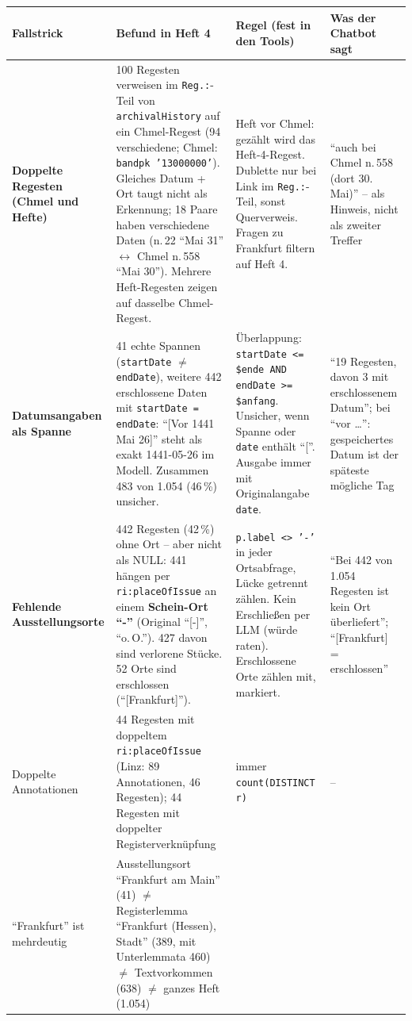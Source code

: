 \documentclass[10pt,a4paper]{article}
\newcommand{\code}[1]{\texttt{\small #1}}
\begin{document}
\begin{small}
\begin{longtable}{@{}p{2.3cm}p{5.7cm}p{4.3cm}p{3.3cm}@{}}
\toprule
\textbf{Fallstrick} & \textbf{Befund in Heft 4} & \textbf{Regel (fest in den Tools)} & \textbf{Was der Chatbot sagt}\\\midrule\endhead
\textbf{Doppelte Regesten (Chmel und Hefte)} &
100 Regesten verweisen im \code{Reg.:}-Teil von \code{archivalHistory} auf ein Chmel-Regest (94 verschiedene; Chmel: \code{bandpk '13000000'}). Gleiches Datum + Ort taugt nicht als Erkennung; 18 Paare haben verschiedene Daten (n.\,22 \enquote{Mai 31} $\leftrightarrow$ Chmel n.\,558 \enquote{Mai 30}). Mehrere Heft-Regesten zeigen auf dasselbe Chmel-Regest. &
Heft vor Chmel: gezählt wird das Heft-4-Regest. Dublette nur bei Link im \code{Reg.:}-Teil, sonst Querverweis. Fragen zu Frankfurt filtern auf Heft 4. &
\enquote{auch bei Chmel n.\,558 (dort 30.\,Mai)} -- als Hinweis, nicht als zweiter Treffer\\\midrule
\textbf{Datums\-angaben als Spanne} &
41 echte Spannen (\code{startDate} $\neq$ \code{endDate}), weitere 442 erschlossene Daten mit \code{startDate = endDate}: \enquote{[Vor 1441 Mai 26]} steht als exakt 1441-05-26 im Modell. Zusammen 483 von 1.054 (46\,\%) unsicher. &
Überlappung: \code{startDate <= \$ende AND endDate >= \$anfang}. Unsicher, wenn Spanne oder \code{date} enthält \enquote{[}. Ausgabe immer mit Originalangabe \code{date}. &
\enquote{19 Regesten, davon 3 mit erschlossenem Datum}; bei \enquote{vor \dots}: gespeichertes Datum ist der späteste mögliche Tag\\\midrule
\textbf{Fehlende Ausstellungsorte} &
442 Regesten (42\,\%) ohne Ort -- aber nicht als NULL: 441 hängen per \code{ri:placeOfIssue} an einem \textbf{Schein-Ort \enquote{-}} (Original \enquote{[-]}, \enquote{o.\,O.}). 427 davon sind verlorene Stücke. 52 Orte sind erschlossen (\enquote{[Frankfurt]}). &
\code{p.label <> '-'} in jeder Ortsabfrage, Lücke getrennt zählen. Kein Erschließen per LLM (würde raten). Erschlossene Orte zählen mit, markiert. &
\enquote{Bei 442 von 1.054 Regesten ist kein Ort überliefert}; \enquote{[Frankfurt] = erschlossen}\\\midrule
Doppelte Annotationen &
44 Regesten mit doppeltem \code{ri:placeOfIssue} (Linz: 89 Annotationen, 46 Regesten); 44 Regesten mit doppelter Registerverknüpfung &
immer \code{count(DISTINCT r)} & --\\\midrule
\enquote{Frankfurt} ist mehrdeutig &
Ausstellungsort \enquote{Frankfurt am Main} (41) $\neq$ Registerlemma \enquote{Frankfurt (Hessen), Stadt} (389, mit Unterlemmata 460) $\neq$ Textvorkommen (638) $\neq$ ganzes Heft (1.054) &

\end{longtable}
\end{small}
\end{document}
